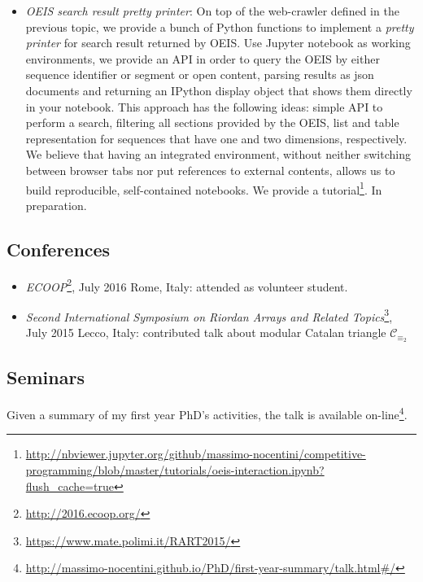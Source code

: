 \documentclass[a4paper]{tufte-handout}
\begin{document}
\begin{itemize}
        \item\emph{OEIS search result pretty printer}: On top of the web-crawler defined in the previous topic, 
            we provide a bunch of Python functions to implement a
            \emph{pretty printer} for search result returned by OEIS. Use Jupyter notebook as working
            environments, we provide an API in order to query the OEIS by either sequence identifier or
            segment or open content, parsing results as json documents and returning an IPython display object
            that shows them directly in your notebook. This approach has the following ideas: simple API to 
            perform a search, filtering all sections provided by the OEIS, list and table representation 
            for sequences that have one and two dimensions, respectively. We believe that having an integrated
            environment, without neither switching between browser tabs nor put references to external contents, 
            allows us to build reproducible, self-contained notebooks. We provide a tutorial\footnote{\url{http://nbviewer.jupyter.org/github/massimo-nocentini/competitive-programming/blob/master/tutorials/oeis-interaction.ipynb?flush_cache=true}}. In preparation.

    \end{itemize}
    
    
    \subsection{Conferences}

    \begin{itemize}
        \item \emph{ECOOP}\footnote{\url{http://2016.ecoop.org/}}, July 2016 Rome, Italy: attended as volunteer student.
        \item \emph{Second International Symposium on Riordan Arrays and Related Topics}\footnote{\url{https://www.mate.polimi.it/RART2015/}}, 
            July 2015 Lecco, Italy: contributed talk about modular Catalan triangle $\mathcal{C}_{\equiv_{2}}$
    \end{itemize}

    \subsection{Seminars}

    Given a summary of my first year PhD's activities, the talk is available on-line\footnote{\url{http://massimo-nocentini.github.io/PhD/first-year-summary/talk.html\#/}}.
\end{document}
